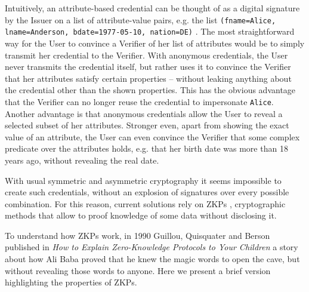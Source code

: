 Intuitively, an attribute-based credential can be thought of as a digital signature by the Issuer on a list of attribute-value pairs, e.g. the list \texttt{\justify(fname=Alice, lname=Anderson, bdate=1977-05-10, nation=DE)} \citep{introCredIBM}.
The most straightforward way for the User to convince a Verifier of her list of attributes would be to simply transmit her credential to the Verifier.
With anonymous credentials, the User never transmits the credential itself, but rather uses it to convince the Verifier that her attributes satisfy certain properties – without leaking anything about the credential other than the shown properties. This has the obvious advantage that the Verifier can no longer reuse the credential to impersonate \texttt{Alice}. Another advantage is that anonymous credentials allow the User to reveal a selected subset of her attributes.
Stronger even, apart from showing the exact value of an attribute, the User can even convince the
Verifier that some complex predicate over the attributes holds, e.g. that her birth date was more than 18 years ago, without revealing the real date.


With usual symmetric and asymmetric cryptography it seems impossible to create such credentials, without an explosion of signatures over every possible combination. For this reason, current solutions rely on  \acp{ZKP}
, cryptographic methods that allow to proof knowledge of some data without disclosing it.

To understand how ZKPs work, in 1990 Guillou, Quisquater and Berson published in \textit{How to Explain Zero-Knowledge Protocols to Your Children} \citep{ZKPcave:story} a story about how Ali Baba proved that he knew the magic words to open the cave, but without revealing those words to anyone. Here we present a brief version highlighting the properties of ZKPs.

\hfil

